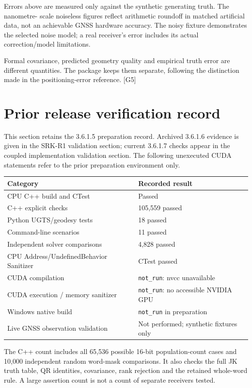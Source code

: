 \documentclass[11pt,a4paper]{article}
\newcommand{\code}[1]{\texttt{#1}}
\newcommand{\ext}[1]{\textcolor{muted}{[#1]}}
\begin{document}
Errors above are measured only against the synthetic generating truth. The nanometre-
scale noiseless figures reflect arithmetic roundoff in matched artificial data, not
an achievable GNSS hardware accuracy. The noisy fixture demonstrates the selected
noise model; a real receiver's error includes its actual correction/model limitations.

Formal covariance, predicted geometry quality and empirical truth error are different
quantities. The package keeps them separate, following the distinction made in the
positioning-error reference. \ext{G5}
\clearpage

\section{Prior release verification record}
This section retains the 3.6.1.5 preparation record. Archived 3.6.1.6 evidence
is given in the SRK-R1 validation section; current 3.6.1.7 checks appear in the
coupled implementation validation section. The following unexecuted
CUDA statements refer to the prior preparation environment only.

\begin{center}
\begin{tabularx}{\textwidth}{@{}P{.48\textwidth}Y@{}}\toprule
\textbf{Category} & \textbf{Recorded result}\\\midrule
CPU C++ build and CTest & Passed\\
C++ explicit checks & 105,559 passed\\
Python UGTS/geodesy tests & 18 passed\\
Command-line scenarios & 11 passed\\
Independent solver comparisons & 4,828 passed\\
CPU Address/UndefinedBehavior Sanitizer & CTest passed\\
CUDA compilation & \code{not\_run}: nvcc unavailable\\
CUDA execution / memory sanitizer & \code{not\_run}: no accessible NVIDIA GPU\\
Windows native build & \code{not\_run} in preparation\\
Live GNSS observation validation & Not performed; synthetic fixtures only\\\bottomrule
\end{tabularx}
\end{center}

The C++ count includes all 65,536 possible 16-bit population-count cases and 10,000
independent random word-mask comparisons. It also checks the full JK truth table,
QR identities, covariance, rank rejection and the retained whole-word rule. A large
assertion count is not a count of separate receivers tested.
\end{document}
